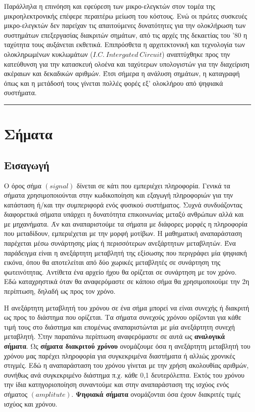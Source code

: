 \documentclass[breaklines=true, 12pt]{article}
\begin{document}
Παράλληλα η επινόηση και εφεύρεση των μικρο-ελεγκτών στον τομέα της
μικροηλεκτρονικής επέφερε περαιτέρω μείωση του κόστους. Ενώ οι
πρώτες συσκευές μικρο-ελεγκτών δεν παρείχαν τις απαιτούμενες δυνατότητες
για την ολοκλήρωση των συστημάτων επεξεργασίας διακριτών σημάτων, από
τις αρχές της δεκαετίας του '80 η ταχύτητα τους αυξάνεται εκθετικά.
Επιπρόσθετα η αρχιτεκτονική και τεχνολογία των ολοκληρωμένων κυκλωμάτων
(\({I.C.\ Intergated\ Circuit}\)) αναπτύχθηκε προς την κατεύθυνση για την κατασκευή
ολοένα και ταχύτερων υπολογιστών για την διαχείριση ακέραιων και δεκαδικών
αριθμών. Έτσι σήμερα η ανάλυση σημάτων, η καταγραφή όπως και η μετάδοσή τους
γίνεται πολλές φορές εξ' ολοκλήρου από ψηφιακά συστήματα.

\noindent\rule{\textwidth}{0.5pt}
\section{Σήματα}
\label{sec:org0707a49}
\subsection{Εισαγωγή}
\label{sec:org00b01b2}
Ο όρος σήμα \({(signal)}\) δίνεται σε κάτι που εμπεριέχει πληροφορία. Γενικά
τα σήματα χρησιμοποιούνται στην κωδικοποίηση και εξαγωγή πληροφοριών για
την κατάσταση ή/και την συμπεριφορά ενός φυσικού συστήματος. Συχνά
συνδυάζοντας διαφορετικά σήματα υπάρχει η δυνατότητα επικοινωνίας μεταξύ
ανθρώπων αλλά και με μηχανήματα. Άν και αναπαριστούμε τα σήματα με διάφορες
μορφές η πληροφορία που μεταδίδουν, εμπεριέχεται με την μορφή μοτίβων. Η
μαθηματική αναπαράσταση παρέχεται μέσω συνάρτησης μίας ή περισσότερων
ανεξάρτητων μεταβλητών. Ένα παράδειγμα είναι η ανεξάρτητη μεταβλητή της
εξίσωσης που περιγράφει μία ψηφιακή εικόνα, όπου θα αποτελείται από δύο
χωρικές μεταβλητές σε συνάρτηση της φωτεινότητας. Αντίθετα ένα αρχείο ήχου
θα ορίζεται σε συνάρτηση με τον χρόνο. Εδώ καταχρηστικά όταν θα αναφερόμαστε
σε κάποιο σήμα θα χρησιμοποιούμε την 2η περίπτωση, δηλαδή ως προς τον χρόνο.

Η ανεξάρτητη μεταβλητή του χρόνου σε ένα σήμα μπορεί να είναι συνεχής ή
διακριτή ως προς το διάστημα που ορίζεται. Τα σήματα συνεχούς χρόνου
ορίζονται για κάθε τιμή τους στο διάστημα και επομένως αναπαριστώνται
με μία ανεξάρτητη συνεχή μεταβλητή. Στην παραπάνω περίπτωση αναφερόμαστε
σε αυτά ως \textbf{αναλογικά σήματα}. Ως \textbf{σήματα διακριτού χρόνου} ονομάζουμε όσα η
ανεξάρτητη μεταβλητή του χρόνου μας παρέχει πληροφορία για συγκεκριμένα
διαστήματα ή αλλιώς χρονικές στιγμές. Εδώ η αναπαράσταση του χρόνου γίνεται
με την χρήση ακολουθίας αριθμών, συνήθως ανά συγκεκριμένο διάστημα π.χ.
κάθε 0,1 δευτερόλεπτα. Εκτός του χρόνου την ίδια κατηγοριοποίηση συναντούμε
και στην αναπαράσταση της ισχύος ενός σήματος \((amplitute)\). \textbf{Ψηφιακά σήματα}
ονομάζονται όσα έχουν διακριτές τιμές ισχύος και χρόνου.
\end{document}
